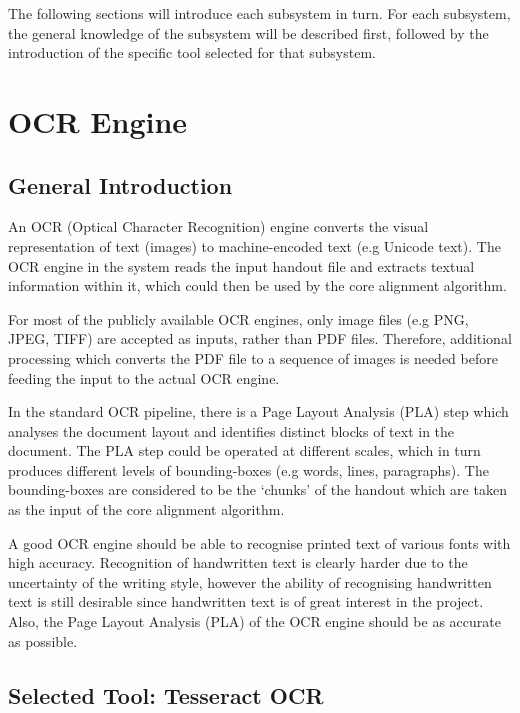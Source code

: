 The following sections will introduce each subsystem in turn. For each subsystem, the general knowledge of the subsystem will be described first, followed by the introduction of the specific tool selected for that subsystem.

\section{OCR Engine}

\subsection{General Introduction}

An OCR (Optical Character Recognition) engine converts the visual representation of text (images) to machine-encoded text (e.g Unicode text). The OCR engine in the system reads the input handout file and extracts textual information within it, which could then be used by the core alignment algorithm.

For most of the publicly available OCR engines, only image files (e.g PNG, JPEG, TIFF) are accepted as inputs, rather than PDF files. Therefore, additional processing which converts the PDF file to a sequence of images is needed before feeding the input to the actual OCR engine. 

In the standard OCR pipeline, there is a Page Layout Analysis (PLA) step which analyses the document layout and identifies distinct blocks of text in the document. The PLA step could be operated at different scales, which in turn produces different levels of bounding-boxes (e.g words, lines, paragraphs). The bounding-boxes are considered to be the `chunks' of the handout which are taken as the input of the core alignment algorithm.

A good OCR engine should be able to recognise printed text of various fonts with high accuracy. Recognition of handwritten text is clearly harder due to the uncertainty of the writing style, however the ability of recognising handwritten text is still desirable since handwritten text is of great interest in the project. Also, the Page Layout Analysis (PLA) of the OCR engine should be as accurate as possible.

\subsection{Selected Tool: Tesseract OCR}
\label{sec:sys-arch-tess}

